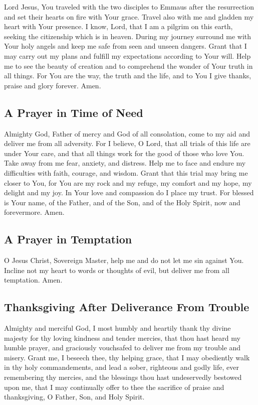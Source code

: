 Lord Jesus, You traveled with the two disciples to Emmaus after the resurrection and set their hearts on fire with Your grace. Travel also with me and gladden my heart with Your presence. I know, Lord, that I am a pilgrim on this earth, seeking the citizenship which is in heaven. During my journey surround me with Your holy angels and keep me safe from seen and unseen dangers. Grant that I may carry out my plans and fulfill my expectations according to Your will. Help me to see the beauty of creation and to comprehend the wonder of Your truth in all things. For You are the way, the truth and the life, and to You I give thanks, praise and glory forever. Amen.

\subsection{A Prayer in Time of Need}

Almighty God, Father of mercy and God of all consolation, come to my aid and deliver me from all adversity. For I believe, O Lord, that all trials of this life are under Your care, and that all things work for the good of those who love You. Take away from me fear, anxiety, and distress. Help me to face and endure my difficulties with faith, courage, and wisdom. Grant that this trial may bring me closer to You, for You are my rock and my refuge, my comfort and my hope, my delight and my joy. In Your love and compassion do I place my trust. For blessed is Your name, of the Father, and of the Son, and of the Holy Spirit, now and forevermore. Amen.

\subsection{A Prayer in Temptation}

O Jesus Christ, Sovereign Master, help me and do not let me sin against You. Incline not my heart to words or thoughts of evil, but deliver me from all temptation. Amen.

\subsection{Thanksgiving After Deliverance From Trouble}

Almighty and merciful God, I most humbly and heartily thank thy divine majesty for thy loving kindness and tender mercies, that thou hast heard my humble prayer, and graciously vouchsafed to deliver me from my trouble and misery. Grant me, I beseech thee, thy helping grace, that I may obediently walk in thy holy commandements, and lead a sober, righteous and godly life, ever remembering thy mercies, and the blessings thou hast undeservedly bestowed upon me, that I may continually offer to thee the sacrifice of praise and thanksgiving, O Father, Son, and Holy Spirit.

